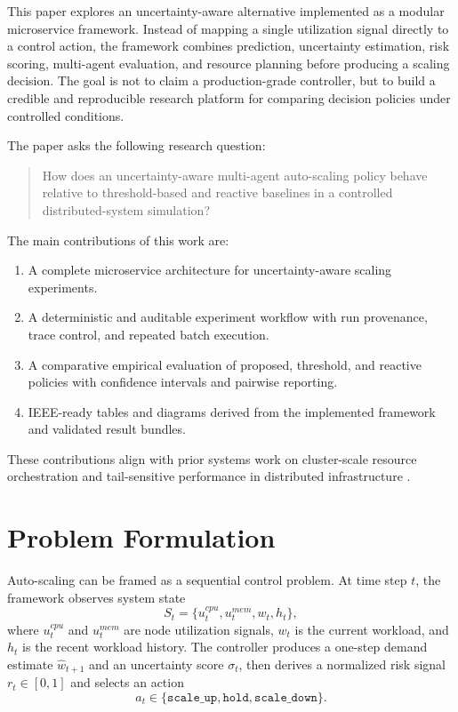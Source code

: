 \documentclass[conference]{IEEEtran}
\begin{document}
This paper explores an uncertainty-aware alternative implemented as a modular microservice framework. Instead of mapping a single utilization signal directly to a control action, the framework combines prediction, uncertainty estimation, risk scoring, multi-agent evaluation, and resource planning before producing a scaling decision. The goal is not to claim a production-grade controller, but to build a credible and reproducible research platform for comparing decision policies under controlled conditions.

The paper asks the following research question:
\begin{quote}
How does an uncertainty-aware multi-agent auto-scaling policy behave relative to threshold-based and reactive baselines in a controlled distributed-system simulation?
\end{quote}

The main contributions of this work are:
\begin{enumerate}[leftmargin=*]
\item A complete microservice architecture for uncertainty-aware scaling experiments.
\item A deterministic and auditable experiment workflow with run provenance, trace control, and repeated batch execution.
\item A comparative empirical evaluation of proposed, threshold, and reactive policies with confidence intervals and pairwise reporting.
\item IEEE-ready tables and diagrams derived from the implemented framework and validated result bundles.
\end{enumerate}
These contributions align with prior systems work on cluster-scale resource orchestration and tail-sensitive performance in distributed infrastructure \cite{borg2015,autopilot2020,borgomega2016,tail2013}.

\section{Problem Formulation}
Auto-scaling can be framed as a sequential control problem. At time step $t$, the framework observes system state
\[
S_t = \{u_t^{cpu}, u_t^{mem}, w_t, h_t\},
\]
where $u_t^{cpu}$ and $u_t^{mem}$ are node utilization signals, $w_t$ is the current workload, and $h_t$ is the recent workload history. The controller produces a one-step demand estimate $\hat{w}_{t+1}$ and an uncertainty score $\sigma_t$, then derives a normalized risk signal $r_t \in [0,1]$ and selects an action
\[
a_t \in \{\texttt{scale\_up}, \texttt{hold}, \texttt{scale\_down}\}.
\]
\end{document}

